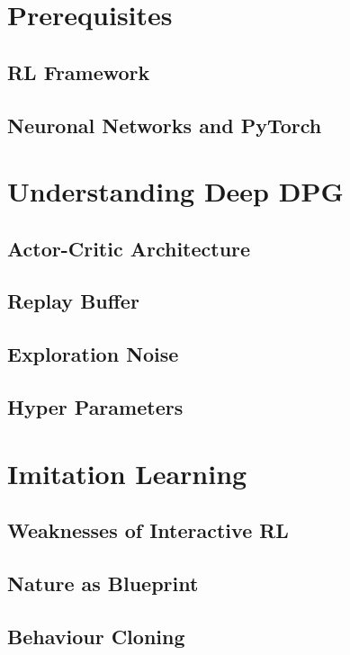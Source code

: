 \section{Prerequisites}
    \subsection{RL Framework}\label{chap:rlframework}
    
    \subsection{Neuronal Networks and PyTorch}
\section{Understanding Deep DPG}

    \subsection{Actor-Critic Architecture}
    
    \subsection{Replay Buffer}
    
    \subsection{Exploration Noise}
    
    \subsection{Hyper Parameters}
    
\section{Imitation Learning}
    
        \subsection{Weaknesses of Interactive RL}
        
        \subsection{Nature as Blueprint}
        
        \subsection{Behaviour Cloning}
        
